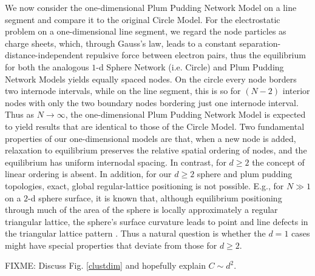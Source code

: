 \documentclass[aps,pre,reprint,superscriptaddress,amsmath,amssymb,nofootinbib]{revtex4-1}
\begin{document}
We now consider the one-dimensional Plum Pudding Network Model on a line segment and compare it to the original Circle Model.
For the electrostatic problem on a one-dimensional line segment, we regard the node particles as charge sheets, which, through Gauss's law, leads to a constant separation-distance-independent repulsive force between electron pairs, thus the equilibrium for both the analogous $1$-d Sphere Network (i.e. Circle) and Plum Pudding Network Models yields equally spaced nodes. 
On the circle every node borders two internode intervals, while on the line segment, this is so for $(N-2)$ interior nodes with only the two boundary nodes bordering just one internode interval.
Thus as $N \to \infty$, the one-dimensional Plum Pudding Network Model is expected to yield results that are identical to those of the Circle Model.
Two fundamental properties of our one-dimensional models are that, when a new node is added, relaxation to equilibrium preserves the relative spatial ordering of nodes, and the equilibrium has uniform internodal spacing.
In contrast, for $d \geq 2$ the concept of linear ordering is absent.
In addition, for our $d \geq 2$ sphere and plum pudding topologies, exact, global regular-lattice positioning is not possible.
E.g., for $N \gg 1$ on a $2$-d sphere surface, it is known that, although equilibrium positioning through much of the area of the sphere is locally approximately a regular triangular lattice, the sphere's surface curvature leads to point and line defects in the triangular lattice pattern \cite{nelson}.
Thus a natural question is whether the $d = 1$ cases might have special properties that deviate from those for $d \geq 2$.

FIXME: Discuss Fig. \ref{clustdim} and hopefully explain $C \sim d^2$.
\end{document}
